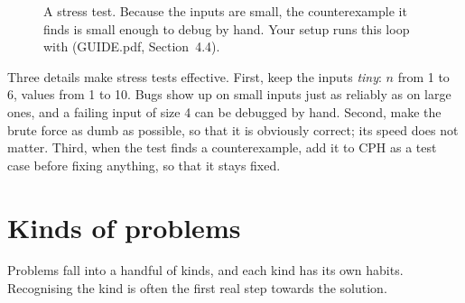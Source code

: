 \begin{figure}[htbp]
\centering
{}
\caption{A stress test. Because the inputs are small, the counterexample it finds is small enough to debug by hand. Your
setup runs this loop with  (GUIDE.pdf, Section~4.4).}
\label{fig:stress}
\end{figure}

Three details make stress tests effective. First, keep the inputs \emph{tiny}: $n$ from 1 to 6, values from 1 to 10. Bugs
show up on small inputs just as reliably as on large ones, and a failing input of size 4 can be debugged by hand. Second,
make the brute force as dumb as possible, so that it is obviously correct; its speed does not matter. Third, when the test
finds a counterexample, add it to CPH as a test case before fixing anything, so that it stays fixed.

\section[Kinds of problems]{Kinds of problems \hfill \bronze}\label{sec:kinds}

Problems fall into a handful of kinds, and each kind has its own habits. Recognising the kind is often the first real step
towards the solution.

